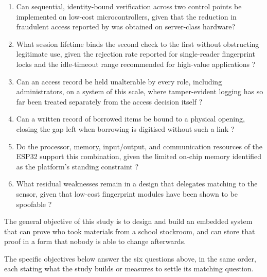 \begin{enumerate}
  \item Can sequential, identity-bound verification across two control points be
        implemented on low-cost microcontrollers, given that the reduction in
        fraudulent access reported by \textcite{mohammed2025} was obtained on
        server-class hardware?
  \item What session lifetime binds the second check to the first without
        obstructing legitimate use, given the rejection rate reported for
        single-reader fingerprint locks \parencite{alsayaydeh2025} and the
        idle-timeout range recommended for high-value applications
        \parencite{owasp2026}?
  \item Can an access record be held unalterable by every role, including
        administrators, on a system of this scale, where tamper-evident logging
        has so far been treated separately from the access decision itself
        \parencite{koisser2023, yagiz2026}?
  \item Can a written record of borrowed items be bound to a physical opening,
        closing the gap left when borrowing is digitised without such a link
        \parencite{cepeda2025, linuwih2025}?
  \item Do the processor, memory, input/output, and communication resources of
        the ESP32 support this combination, given the limited on-chip memory
        identified as the platform's standing constraint \parencite{rahman2026}?
  \item What residual weaknesses remain in a design that delegates matching to
        the sensor, given that low-cost fingerprint modules have been shown to
        be spoofable \parencite{rad2024}?
\end{enumerate}


The general objective of this study is to design and build an embedded system
that can prove who took materials from a school stockroom, and can store that
proof in a form that nobody is able to change afterwards.

The specific objectives below answer the six questions above, in the same
order, each stating what the study builds or measures to settle its
matching question.

